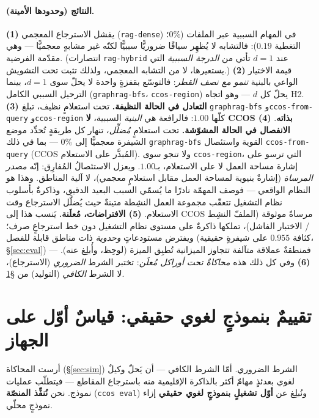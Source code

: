 \documentclass[11pt]{article}
\newcommand{\code}[1]{\textenglish{\texttt{#1}}}
\begin{document}
\paragraph{النتائج (وحدودها الأمينة).}
\textbf{(1)} يفشل الاسترجاع المعجمي (\code{rag-dense}) في المهام السببية عبر الملفات ($0\%$؛
التغطية $0.19$): فالتشابه لا يُظهِر سياقًا ضروريًّا سببيًّا لكنّه غير مشابهٍ معجميًّا --- وهي
مقدّمة الفرضية. (انتصارات \code{rag-hybrid} عند $d{=}1$ تأتي من \emph{الدرجة السببية} التي
يستعيرها، لا من التشابه المعجمي، ولذلك تثبت تحت التشويش.)
\textbf{(2)} قيمة الاختيار الواعي بالبنية \emph{تنمو مع نصف القطر}: فالتوسّع بقفزةٍ واحدة لا
يحلّ سوى $d{=}1$، بينما الترحيل السببي الكامل (\code{graphrag-bfs}، \code{ccos-region}) يحلّ
كل $d$ --- وهو اتجاه H2.
\textbf{(3) التعادل في الحالة النظيفة.} تحت استعلامٍ نظيف، تبلغ \code{graphrag-bfs}
و\code{ccos-from-query} و\code{ccos-region} كلّها $1.00$: فالرافعة هي \emph{البنية} السببية،
\textbf{لا CCOS بذاته}.
\textbf{(4) الانفصال في الحالة المشوّشة.} تحت استعلامٍ \emph{مُضلِّل}، تنهار كل طريقةٍ تُحدِّد
موضع الشيفرة معجميًّا إلى $0\%$ --- بما في ذلك \code{graphrag-bfs} القوية \emph{و}استئصال
\code{ccos-from-query} (CCOS المُبذَّر على الاستعلام). ولا تنجو سوى \code{ccos-region}، التي
ترسو على إشارة مساحة العمل لا على الاستعلام، بـ$1.00$. ويعزل الاستئصالُ المُفارِق: إنّه
\emph{مصدر المرساة} (إشارةٌ بنيوية لمساحة العمل مقابل استعلامٍ معجمي)، لا آلية المناطق. وهذا
هو النظام الواقعي --- فوصف المهمّة نادرًا ما يُسمّي السبب البعيد الدقيق، وذاكرةٌ بأسلوب نظام
التشغيل تتعقّب مجموعة العمل النشِطة متينةٌ حيث يُضلَّل الاسترجاع وقت الاستعلام.
\textbf{(5) الافتراضات، مُعلَنة.} يَنسب هذا إلى CCOS مرساةً موثوقة (الملفّ النشِط / الاختبار
الفاشل)، تملكها ذاكرةٌ على مستوى نظام التشغيل دون خط استرجاعٍ صرف؛ ويفترض مستودعاتٍ
\emph{وحدوية} ذات مناطق قابلة للفصل (كثافة $0.955$ على شيفرةٍ حقيقية، \S\ref{sec:eval}) ---
فمنطقةٌ عملاقة متآلفة تتجاوز الميزانية تُطبِق الميزة (لوحِظ، وأُبلِغ عنه).
\textbf{(6)} وفي كل ذلك هذه \emph{محاكاةٌ تحت أوراكل مُعلَن}: تختبر الشرط \emph{الضروري}
(الاسترجاع)، لا الشرط \emph{الكافي} (التوليد) من \S\ref{sec:protocol}.

\section{تقييمٌ بنموذجٍ لغوي حقيقي: قياسٌ أوّل على الجهاز}\label{sec:protocol}

أرست المحاكاة (\S\ref{sec:sim}) الشرط الضروري. أمّا الشرط الكافي --- أن يَحلّ وكيلٌ لغوي
بعدئذٍ مهامّ أكثر بالذاكرة الإقليمية منه باسترجاع المقاطع --- فيتطلّب عمليات نموذج. نحن
\textbf{نُنفِّذ المنصّة} (\code{ccos eval}) ونُبلِغ عن \textbf{أوّل تشغيلٍ بنموذجٍ لغوي
حقيقي} إزاء نموذجٍ محلّي.
\end{document}
